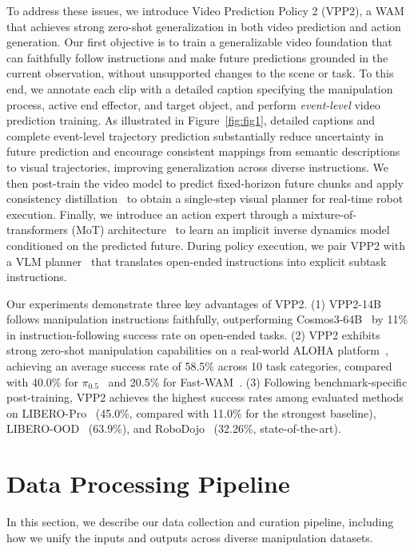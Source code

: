 To address these issues, we introduce Video Prediction Policy 2 (VPP2), a WAM that achieves strong zero-shot generalization in both video prediction and action generation. Our first objective is to train a generalizable video foundation that can faithfully follow instructions and make future predictions grounded in the current observation, without unsupported changes to the scene or task. To this end, we annotate each clip with a detailed caption specifying the manipulation process, active end effector, and target object, and perform \textit{event-level} video prediction training. As illustrated in Figure~\ref{fig:fig1}, detailed captions and complete event-level trajectory prediction substantially reduce uncertainty in future prediction and encourage consistent mappings from semantic descriptions to visual trajectories, improving generalization across diverse instructions. We then post-train the video model to predict fixed-horizon future chunks and apply consistency distillation~\citep{song2023consistency} to obtain a single-step visual planner for real-time robot execution. Finally, we introduce an action expert through a mixture-of-transformers (MoT) architecture~\citep{liang2025mixture} to learn an implicit inverse dynamics model conditioned on the predicted future. During policy execution, we pair VPP2 with a VLM planner~\citep{bai2025qwen3,seed2026seed2} that translates open-ended instructions into explicit subtask instructions.

Our experiments demonstrate three key advantages of VPP2. (1) VPP2-14B follows manipulation instructions faithfully, outperforming Cosmos3-64B~\citep{agarwal2026cosmos} by 11\% in instruction-following success rate on open-ended tasks. (2) VPP2 exhibits strong zero-shot manipulation capabilities on a real-world ALOHA platform~\citep{zhao2023learning}, achieving an average success rate of 58.5\% across 10 task categories, compared with 40.0\% for $\pi_{0.5}$~\citep{intelligence2025pi_} and 20.5\% for Fast-WAM~\citep{yuan2026fastwam}. (3) Following benchmark-specific post-training, VPP2 achieves the highest success rates among evaluated methods on LIBERO-Pro~\citep{zhou2025liberopro} (45.0\%, compared with 11.0\% for the strongest baseline), LIBERO-OOD~\citep{li2025vlas,mishra2026understanding} (63.9\%), and RoboDojo~\citep{chen2026robodojo} (32.26\%, state-of-the-art).

\vspace{-1mm}
\section{Data Processing Pipeline}
\vspace{-1mm}
In this section, we describe our data collection and curation pipeline, including how we unify the inputs and outputs across diverse manipulation datasets.

